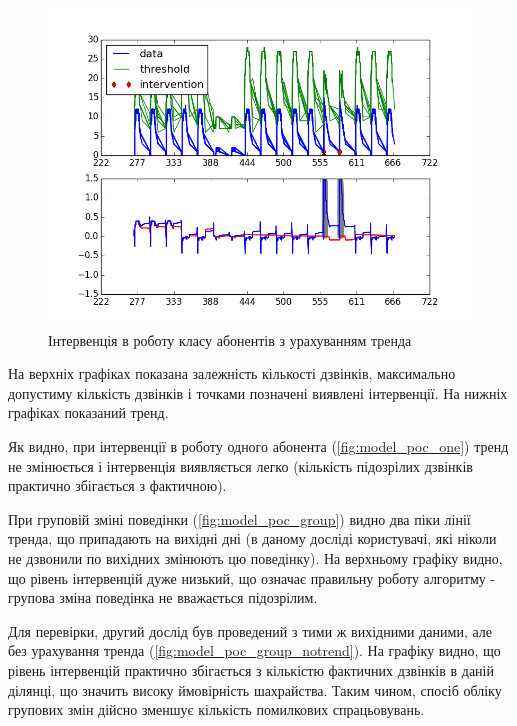 \begin{figure}[h!]
        \begin{center}
            \includegraphics[scale=0.6]{resources/model_1_5_group.png}
        \end{center}
        \caption{Інтервенція в роботу класу абонентів з урахуванням тренда}
        \label{fig:model_poc_group}
\end{figure}


На верхніх графіках показана залежність кількості дзвінків, максимально допустиму кількість дзвінків і точками позначені виявлені інтервенції. На нижніх графіках показаний тренд.

Як видно, при інтервенції в роботу одного абонента (\autoref{fig:model_poc_one}) тренд не змінюється і інтервенція виявляється легко (кількість підозрілих дзвінків практично збігається з фактичною).

При груповій зміні поведінки (\autoref{fig:model_poc_group}) видно два піки лінії тренда, що припадають на вихідні дні (в даному досліді користувачі, які ніколи не дзвонили по вихідних змінюють цю поведінку). На верхньому графіку видно, що рівень інтервенцій дуже низький, що означає правильну роботу алгоритму - групова зміна поведінка не вважається підозрілим.

Для перевірки, другий дослід був проведений з тими ж вихідними даними, але без урахування тренда (\autoref{fig:model_poc_group_notrend}). На графіку видно, що рівень інтервенцій практично збігається з кількістю фактичних дзвінків в даній ділянці, що значить високу ймовірність шахрайства. Таким чином, спосіб обліку групових змін дійсно зменшує кількість помилкових спрацьовувань.

